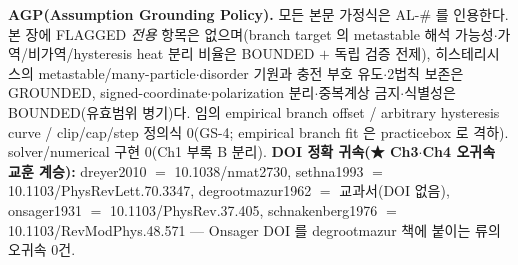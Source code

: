 \textbf{AGP(Assumption Grounding Policy).} 모든 본문 가정식은 AL-\# 를 인용한다. 본 장에 FLAGGED \emph{전용}
항목은 없으며(branch target 의 metastable 해석 가능성$\cdot$가역/비가역/hysteresis heat 분리 비율은 BOUNDED $+$
독립 검증 전제), 히스테리시스의 metastable/many-particle$\cdot$disorder 기원과 충전 부호 유도$\cdot$2법칙 보존은
GROUNDED, signed-coordinate$\cdot$polarization 분리$\cdot$중복계상 금지$\cdot$식별성은 BOUNDED(유효범위 병기)다.
임의 empirical branch offset / arbitrary hysteresis curve / clip/cap/step 정의식 0(GS-4; empirical branch fit
은 practicebox 로 격하). solver/numerical 구현 0(Ch1 부록 B 분리). \textbf{DOI 정확 귀속(★ Ch3$\cdot$Ch4 오귀속 교훈
계승):} dreyer2010 $=$ 10.1038/nmat2730, sethna1993 $=$ 10.1103/PhysRevLett.70.3347, degrootmazur1962 $=$
교과서(DOI 없음), onsager1931 $=$ 10.1103/PhysRev.37.405, schnakenberg1976 $=$ 10.1103/RevModPhys.48.571 —
Onsager DOI 를 degrootmazur 책에 붙이는 류의 오귀속 0건.

